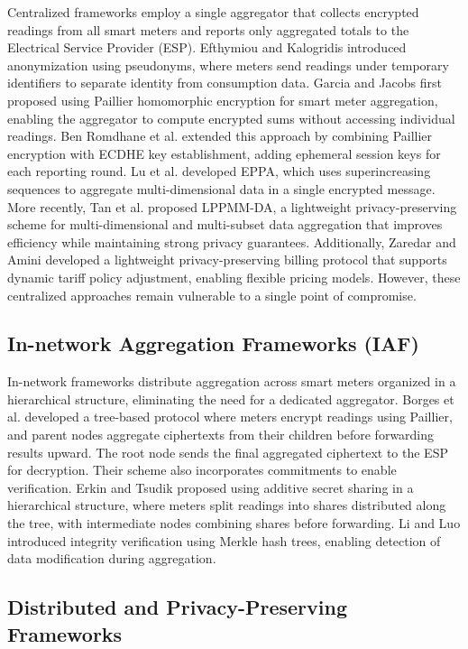 \documentclass[conference]{IEEEtran}
\begin{document}
Centralized frameworks employ a single aggregator that collects encrypted readings from all smart meters and reports only aggregated totals to the Electrical Service Provider (ESP). Efthymiou and Kalogridis introduced anonymization using pseudonyms, where meters send readings under temporary identifiers to separate identity from consumption data. Garcia and Jacobs first proposed using Paillier homomorphic encryption for smart meter aggregation, enabling the aggregator to compute encrypted sums without accessing individual readings. Ben Romdhane et al. \cite{ben2022privacy} extended this approach by combining Paillier encryption with ECDHE key establishment, adding ephemeral session keys for each reporting round. Lu et al. developed EPPA, which uses superincreasing sequences to aggregate multi-dimensional data in a single encrypted message. More recently, Tan et al. \cite{tan2024lppmm} proposed LPPMM-DA, a lightweight privacy-preserving scheme for multi-dimensional and multi-subset data aggregation that improves efficiency while maintaining strong privacy guarantees. Additionally, Zaredar and Amini \cite{zaredar2024lightweight} developed a lightweight privacy-preserving billing protocol that supports dynamic tariff policy adjustment, enabling flexible pricing models. However, these centralized approaches remain vulnerable to a single point of compromise.

\subsection{In-network Aggregation Frameworks (IAF)}

In-network frameworks distribute aggregation across smart meters organized in a hierarchical structure, eliminating the need for a dedicated aggregator. Borges et al. \cite{borges2014privacy} developed a tree-based protocol where meters encrypt readings using Paillier, and parent nodes aggregate ciphertexts from their children before forwarding results upward. The root node sends the final aggregated ciphertext to the ESP for decryption. Their scheme also incorporates commitments to enable verification. Erkin and Tsudik proposed using additive secret sharing in a hierarchical structure, where meters split readings into shares distributed along the tree, with intermediate nodes combining shares before forwarding. Li and Luo introduced integrity verification using Merkle hash trees, enabling detection of data modification during aggregation.

\subsection{Distributed and Privacy-Preserving Frameworks}
\end{document}
